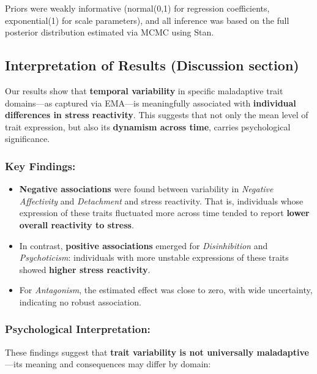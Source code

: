 \documentclass[
  11pt,
  a4paper,
  onecolumn]{article}
\providecommand{\tightlist}{%
  \setlength{\itemsep}{0pt}\setlength{\parskip}{0pt}}
\begin{document}
Priors were weakly informative (normal(0,1) for regression coefficients,
exponential(1) for scale parameters), and all inference was based on the
full posterior distribution estimated via MCMC using Stan.

\subsection{Interpretation of Results (Discussion
section)}\label{interpretation-of-results-discussion-section}

Our results show that \textbf{temporal variability} in specific
maladaptive trait domains---as captured via EMA---is meaningfully
associated with \textbf{individual differences in stress reactivity}.
This suggests that not only the mean level of trait expression, but also
its \textbf{dynamism across time}, carries psychological significance.

\subsubsection{Key Findings:}\label{key-findings}

\begin{itemize}
\tightlist
\item
  \textbf{Negative associations} were found between variability in
  \emph{Negative Affectivity} and \emph{Detachment} and stress
  reactivity. That is, individuals whose expression of these traits
  fluctuated more across time tended to report \textbf{lower overall
  reactivity to stress}.
\item
  In contrast, \textbf{positive associations} emerged for
  \emph{Disinhibition} and \emph{Psychoticism}: individuals with more
  unstable expressions of these traits showed \textbf{higher stress
  reactivity}.
\item
  For \emph{Antagonism}, the estimated effect was close to zero, with
  wide uncertainty, indicating no robust association.
\end{itemize}

\subsubsection{Psychological
Interpretation:}\label{psychological-interpretation}

These findings suggest that \textbf{trait variability is not universally
maladaptive}---its meaning and consequences may differ by domain:
\end{document}

